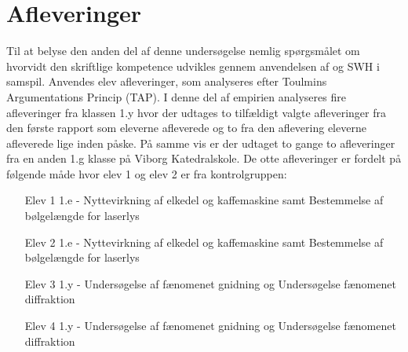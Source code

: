 \section{Afleveringer}
\label{sec:afv}
Til at belyse den anden del af denne undersøgelse nemlig spørgsmålet om hvorvidt den skriftlige kompetence udvikles gennem anvendelsen af \ib{} og SWH i samspil. Anvendes elev afleveringer, som analyseres efter Toulmins Argumentations Princip (TAP). I denne del af empirien analyseres fire afleveringer fra klassen 1.y hvor der udtages to tilfældigt valgte afleveringer fra den første rapport som eleverne afleverede og to fra den aflevering eleverne afleverede lige inden påske. På samme vis er der udtaget to gange to afleveringer fra en anden 1.g klasse på Viborg Katedralskole.
De otte afleveringer er fordelt på følgende måde hvor elev 1 og elev 2 er fra kontrolgruppen: 
\begin{enumerate}
	\item[Elev 1] 1.e - Nyttevirkning af elkedel og kaffemaskine samt Bestemmelse af bølgelængde for laserlys\vspace{-15pt}
	\item[Elev 2] 1.e - Nyttevirkning af elkedel og kaffemaskine samt Bestemmelse af bølgelængde for laserlys\vspace{-15pt}
	\item[Elev 3] 1.y - Undersøgelse af fænomenet gnidning og Undersøgelse fænomenet diffraktion\vspace{-15pt}
	\item[Elev 4] 1.y - Undersøgelse af fænomenet gnidning og Undersøgelse fænomenet diffraktion
\end{enumerate}
